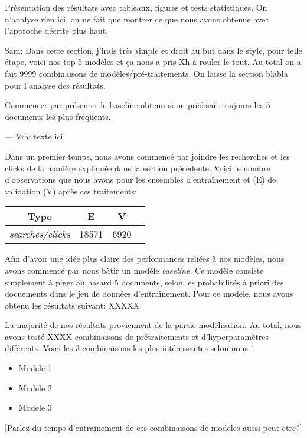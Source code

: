 Présentation des résultats avec tableaux, figures et tests statistiques.
On n'analyse rien ici, on ne fait que montrer ce que nous avons obtenue avec l'approche décrite plus haut.

Sam: Dans cette section, j'irais très simple et droit au but dans le style, pour telle étape, voici nos top 5 modèles et ça nous a pris Xh à rouler le tout.
Au total on a fait 9999 combinaisons de modèles/pré-traitements.
On laisse la section blabla pour l'analyse des résultats.

Commencer par présenter le baseline obtenu si on prédisait toujours les 5 documents les plus fréquents.

--- Vrai texte ici

Dans un premier temps, nous avons commencé par joindre les recherches et les clicks de la manière expliquée dans la section précédente. Voici le nombre d'observations que nous avons pour les ensembles d'entraînement et (E) de validation (V) après ces traitements:

\begin{center}
  \begin{tabular}{ |c|c|c|c| } 
     \hline
     Type & E & V \\
     \hline
     \hline
     \textit{searches/clicks} & 18571 & 6920 \\ 
     \hline
  \end{tabular}
\end{center}

Afin d'avoir une idée plus claire des performances reliées à nos modèles, nous avons commencé par nous bâtir un modèle \textit{baseline}. Ce modèle consiste simplement à piger au hasard 5 documents, selon les probabilités à priori des docuements dans le jeu de données d'entraînement. Pour ce modele, nous avons obtenu les résultats suivant: XXXXX

La majorité de nos résultats proviennent de la partie modélisation. Au total, nous avons testé XXXX combinaisons de prétraitements et d'hyperparamètres différents. Voici les 3 combinaisons les plus intéressantes selon nous :

\begin{itemize}
  \item Modele 1
  \item Modele 2
  \item Modele 3
\end{itemize}

[Parlez du temps d'entrainement de ces combinaisons de modeles aussi peut-etre?]


